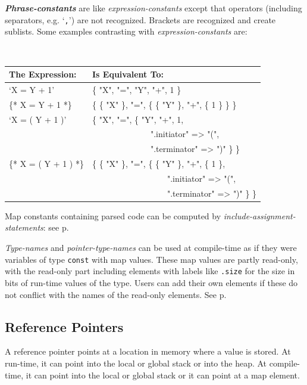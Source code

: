 \documentclass[12pt]{article}
\newcommand{\emkey}[1]{{\em \bfseries #1}}
\newcommand{\pagref}[1]{p\pageref{#1}}
\begin{document}
\emkey{Phrase-constants}\label{PHRASE-CONSTANT}
are like {\em expression-constants} except that
operators (including separators, e.g. `{\tt ,}') are not recognized.
Brackets are recognized and create sublists.  Some examples contrasting
with {\em expression-constants} are:
\begin{center} \tt
\begin{tabular}{l@{~~~}l}
\rm The Expression:	& \rm Is Equivalent To:
\\\hline
`X = Y + 1'			& \{ "X", "=", "Y", "+", 1 \}
\\[0.5ex]
\{* X = Y + 1 *\}		& \{ \{ "X" \}, "=",
                                     \{ \{ "Y" \}, "+", \{ 1 \} \} \}
\\[0.5ex]
`X = ( Y + 1 )'		& \{ "X", "=", \{ "Y", "+", 1, \\
                        & ~~~~~~~~~~~~~~".initiator" => "(", \\
                        & ~~~~~~~~~~~~~~".terminator" => ")" \} \}
\\[0.5ex]
\{* X = ( Y + 1 ) *\}	& \{ \{ "X" \}, "=", \{ \{ "Y" \}, "+", \{ 1 \}, \\
                        & ~~~~~~~~~~~~~~~~~~".initiator" => "(", \\
                        & ~~~~~~~~~~~~~~~~~~".terminator" => ")" \} \}
\end{tabular}
\end{center}

Map constants containing parsed code can be computed
by {\em include-assignment-statements}:
see \pagref{INCLUDE-ASSIGNMENT-STATEMENT}.

{\em Type-names} and {\em pointer-type-names} can be used at
compile-time as if they were variables of type {\tt const}
with map values.  These map values are partly read-only,
with the read-only part including elements with labels like
{\tt .size} for the size in bits of run-time values of the type.
Users can add their own elements if these do not conflict
with the names of the read-only elements.
See \pagref{TYPE-FIELD-SUBFIELD-MAPS}.

\subsection{Reference Pointers}
\label{REFERENCE-POINTERS}

A reference pointer points at a location in memory where a value
is stored.  At run-time, it can point into the local or global stack or
into the heap.  At compile-time, it can point into the local or global
stack or it can point at a map element.
\end{document}
